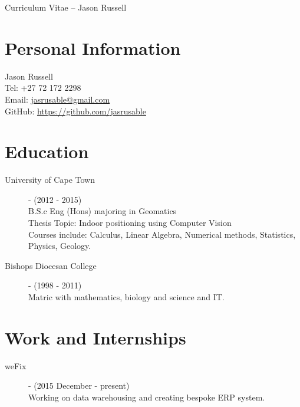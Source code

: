 \documentclass[margin,line,a4paper]{resume}
\begin{document}
    {\sc \Large Curriculum Vitae -- Jason Russell}
    \begin{resume}
        \vspace{0.5cm}

        \section{\mysidestyle Personal Information}
            Jason Russell\\
            Tel: +27 72 172 2298\\
            Email: \href{mailto:jasrusable@gmail.com}{jasrusable@gmail.com}\\
            GitHub: \href{https://github.com/jasrusable}{https://github.com/jasrusable}\\

        \section{\mysidestyle Education}
            \begin{description}
                \item[University of Cape Town] - (2012 - 2015) \\
                    B.S.c Eng (Hons) majoring in Geomatics \\
                    Thesis Topic: Indoor positioning using Computer Vision \\
                    Courses include: Calculus, Linear Algebra, Numerical methods, Statistics, Physics, Geology.
                   
                \item[Bishops Diocesan College] - (1998 - 2011) \\
                Matric with mathematics, biology and science and IT.
            \end{description}


        \section{\mysidestyle Work and Internships}
            \begin{description}
                \item [weFix] - (2015 December - present) \\
                    Working on data warehousing and creating bespoke ERP system.
            \end{description}
        

\end{resume}
\end{document}
